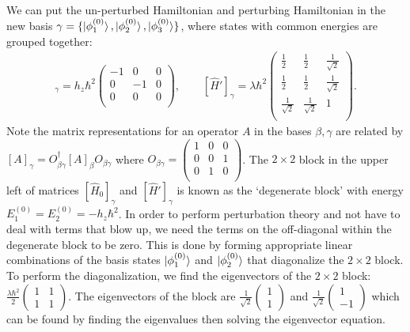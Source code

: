 \documentclass[10pt]{article}
\newcommand{\1}{\mathbf 1}
\begin{document}
We can put the un-perturbed Hamiltonian and perturbing Hamiltonian in the new basis $\gamma = \{\ket{\phi_1^{(0)}},\ket{\phi_2^{(0)}},\ket{\phi_3^{(0)}}\}$, where states with common energies are grouped together:
\begin{align}
	[\hat H_0]_\gamma
	=h_z\hbar^2
	\left(
	\begin{array}{ccc}
	 -1 & 0 & 0 \\
	 0 & -1 & 0 \\
	 0 & 0 & 0 \\
	\end{array}
	\right)
	,\qquad
	[\hat H']_\gamma
	=
	\lambda \hbar^2
	\left(
\begin{array}{ccc}
 \frac{1}{2} & \frac{1}{2} & \frac{1}{\sqrt{2}} \\
 \frac{1}{2} & \frac{1}{2} & \frac{1}{\sqrt{2}} \\
 \frac{1}{\sqrt{2}} & \frac{1}{\sqrt{2}} & 1 \\
\end{array}
\right).
\end{align}
Note the matrix representations for an operator $A$ in the bases $\beta, \gamma$ are related by $[A]_\gamma = O_{\beta \gamma}^\dagger [A]_\beta O_{\beta \gamma}$ where $O_{\beta\gamma}= \left(
	\begin{array}{ccc}
	 1 & 0 & 0 \\
	 0 & 0 & 1 \\
	 0 & 1 & 0 \\
	\end{array}
	\right)$.
The $2 \times 2$ block in the upper left of matrices $	[\hat H_0]_\gamma$ and $[\hat H']_\gamma$ is known as the `degenerate block' with energy $E_1^{(0)} = E_2^{(0)} = - h_z \hbar^2$.
In order to perform perturbation theory and not have to deal with terms that blow up, we need the terms on the off-diagonal within the degenerate block to be zero.
This is done by forming appropriate linear combinations of the basis states $\ket{\phi_1^{(0)}}$ and $\ket{\phi_2^{(0)}}$ that diagonalize the $2 \times 2$ block.
To perform the diagonalization, we find the eigenvectors of the $2 \times 2$ block: $\frac{\lambda\hbar^2}{2}\left(
	\begin{array}{cc}
		1 & 1\\
		1 & 1
	\end{array}
\right)$.
The eigenvectors of the block are $\frac{1}{\sqrt{2}} \left(\begin{array}{c}
	1\\1
\end{array}\right)$ and $\frac{1}{\sqrt{2}} \left(\begin{array}{c}
	1\\-1
\end{array}\right)$ which can be found by finding the eigenvalues then solving the eigenvector equation.
\end{document}
